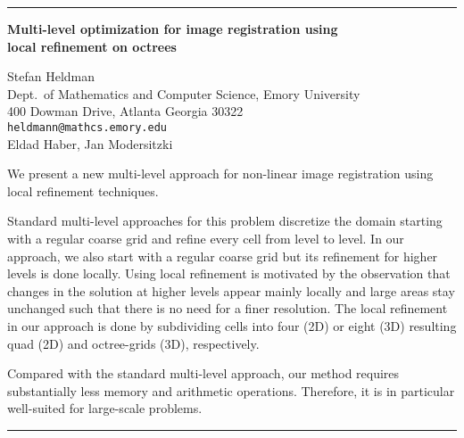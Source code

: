 \documentclass[twosided]{report}
\begin{document}
	\begin{center} \rule{6in}{1pt} \end{center}

\begin{center}
{\large			%
{\bf Multi-level optimization for image registration using \\
	local refinement on octrees}}

	Stefan Heldman \\
	Dept.~of Mathematics and Computer Science, Emory University \\
	400 Dowman Drive, Atlanta Georgia 30322 \\
	{\tt heldmann@mathcs.emory.edu}
	\\ Eldad Haber, Jan Modersitzki
\end{center}
We present a new multi-level approach for non-linear image
registration using local refinement techniques.

Standard multi-level approaches for this problem discretize
the domain starting with a regular coarse grid and refine
every cell from level to level. In our approach, we also
start with a regular coarse grid but its refinement for
higher levels is done locally. Using local refinement is
motivated by the observation that changes in the solution at
higher levels appear mainly locally and large areas stay
unchanged such that there is no need for a finer resolution.
The local refinement in our approach is done by subdividing
cells into four (2D) or eight (3D) resulting quad (2D) and
octree-grids (3D), respectively.

Compared with the standard multi-level approach, our method
requires substantially less memory and arithmetic
operations. Therefore, it is in particular well-suited for
large-scale problems.



	\begin{center} \rule{6in}{1pt} \end{center}
\end{document}
